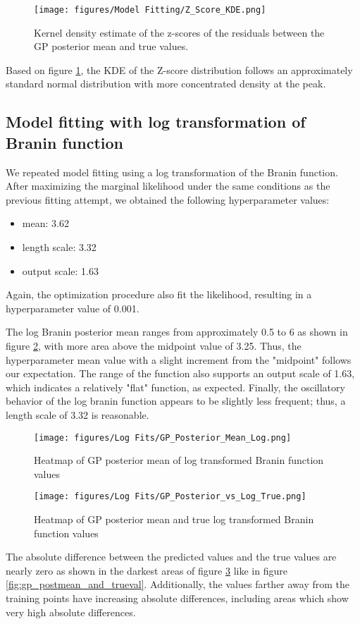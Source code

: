 \documentclass[11pt]{article}
\numberwithin{equation}{section}
\begin{document}
\begin{figure}[H]
  \centering
  \texttt{[image: figures/Model Fitting/Z\_Score\_KDE.png]}
  \caption{Kernel density estimate of the z-scores of the residuals between the GP posterior mean and true values.}
  \label{fig:zscore_kde}
\end{figure}
Based on figure \ref{fig:zscore_kde}, the KDE of the Z-score distribution follows an approximately standard normal distribution with more concentrated density at the peak.

\subsection*{Model fitting with log transformation of Branin function}
We repeated model fitting using a log transformation of the Branin function. After maximizing the marginal likelihood under the same conditions as the previous fitting attempt, we obtained the following hyperparameter values:
\begin{itemize}
  \item
    mean: 3.62
  \item
    length scale: 3.32
  \item
    output scale: 1.63
\end{itemize}
Again, the optimization procedure also fit the likelihood, resulting in a hyperparameter value of 0.001.

The log Branin posterior mean ranges from approximately 0.5 to 6 as shown in figure \ref{fig:gp_post_mean_log}, with more area above the midpoint value of 3.25. Thus, the hyperparameter mean value with a slight increment from the "midpoint" follows our expectation. The range of the function also supports an output scale of 1.63, which indicates a relatively "flat" function, as expected. Finally, the oscillatory behavior of the log branin function appears to be slightly less frequent; thus, a length scale of 3.32 is reasonable. 

\begin{figure}[H]
  \centering
  \texttt{[image: figures/Log Fits/GP\_Posterior\_Mean\_Log.png]}
  \caption{Heatmap of GP posterior mean of log transformed Branin function values}
  \label{fig:gp_post_mean_log}
\end{figure}

\begin{figure}[H]
  \centering
  \texttt{[image: figures/Log Fits/GP\_Posterior\_vs\_Log\_True.png]}
  \caption{Heatmap of GP posterior mean and true log transformed Branin function values}
  \label{fig:gp_post_mean_true_log}
\end{figure}
The absolute difference between the predicted values and the true values are nearly zero as shown in the darkest areas of figure \ref{fig:gp_post_mean_true_log} like in figure \ref{fig:gp_postmean_and_trueval}. Additionally, the values farther away from the training points have increasing absolute differences, including areas which show very high absolute differences.
\end{document}
